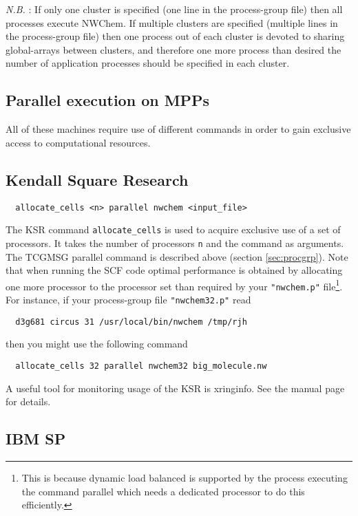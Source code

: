 {\em N.B.} : If only one cluster is specified (one line in the
process-group file) then all processes execute NWChem.  If multiple
clusters are specified (multiple lines in the process-group file)
then one process out of each cluster is devoted to sharing
global-arrays between clusters, and therefore one more process than
desired the number of application processes should be specified in
each cluster.

\subsection{Parallel execution on MPPs}

All of these machines require use of different commands in order to
gain exclusive access to computational resources.

\subsection{Kendall Square Research}

\begin{verbatim}
  allocate_cells <n> parallel nwchem <input_file>
\end{verbatim}

The KSR command \verb+allocate_cells+ is used to acquire exclusive use
of a set of processors.  It takes the number of processors \verb+n+ and
the command as arguments.  The TCGMSG parallel command is described
above (section \ref{sec:procgrp}).  Note that when running the SCF
code optimal performance is obtained by allocating one more processor
to the processor set than required by your \verb+"nwchem.p"+
file\footnote{This is because dynamic load balanced is supported by
the process executing the command parallel which needs a dedicated
processor to do this efficiently.}.  For instance, if your
process-group file \verb+"nwchem32.p"+ read
\begin{verbatim}
  d3g681 circus 31 /usr/local/bin/nwchem /tmp/rjh
\end{verbatim}
then you might use the following command
\begin{verbatim}
  allocate_cells 32 parallel nwchem32 big_molecule.nw
\end{verbatim}

A useful tool for monitoring usage of the KSR is xringinfo.  See the
manual page for details.

\subsection{IBM SP}

